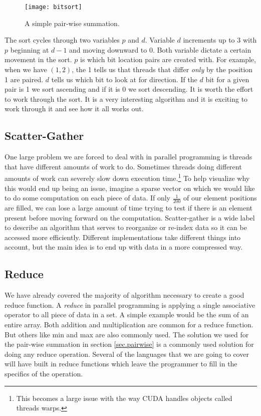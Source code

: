 \documentclass{article}
\newcommand{\comp}[1]{{\ttfamily #1}}
\begin{document}
     \done{}
    \begin{figure}
    \centering
    \texttt{[image: bitsort]}
    \caption{A simple pair-wise summation.}
    \end{figure}

    The sort cycles through two variables $p$ and $d$. Variable $d$ increments up to 3 with $p$ beginning at $d-1$ and moving downward to 0. Both variable dictate a certain movement in the sort. $p$ is which bit location pairs are created with. For example, when we have $(1,2)$, the 1 tells us that threads that differ \emph{only} by the position 1 are paired. $d$ tells us which bit to look at for direction. If the $d$ bit for a given pair is 1 we sort ascending and if it is 0 we sort descending. It is worth the effort to work through the sort. It is a very interesting algorithm and it is exciting to work through it and see how it all works out.



    \subsection{Scatter-Gather}
    \label{sec.sg}
    One large problem we are forced to deal with in parallel programming is threads that have different amounts of work to do. Sometimes threads doing different amounts of work can severely slow down execution time.\footnote{This becomes a large issue with the way CUDA handles objects called threads warps.} To help visualize why this would end up being an issue, imagine a sparse vector on which we would like to do some computation on each piece of data. If only $\frac{1}{200}$ of our element positions are filled, we can lose a large amount of time trying to test if there is an element present before moving forward on the computation. Scatter-gather is a wide label to describe an algorithm that serves to reorganize or re-index data so it can be accessed more efficiently. Different implementations take different things into account, but the main idea is to end up with data in a more compressed way.

    \subsection{Reduce}
    \label{sec.reduce}
    We have already covered the majority of algorithm necessary to create a good reduce function. A \emph{reduce} in parallel programming is applying a single associative operator to all piece of data in a set. A simple example would be the sum of an entire array. Both addition and multiplication are common for a reduce function. But others like \comp{min} and \comp{max} are also commonly used. The solution we used for the pair-wise summation in section \ref{sec.pairwise} is a commonly used solution for doing any reduce operation. Several of the languages that we are going to cover will have built in reduce functions which leave the programmer to fill in the specifics of the operation. 
\end{document}
